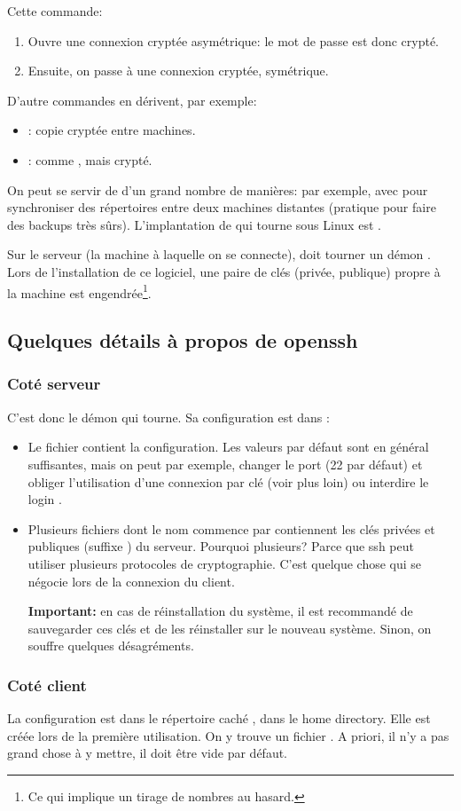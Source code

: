 \begin{center}
\end{center}

Cette commande:
\begin{enumerate}
\item Ouvre une connexion cryptée asymétrique: le mot de passe est
  donc crypté.
\item Ensuite, on passe à une connexion cryptée, symétrique.
\end{enumerate}

D'autre commandes en dérivent, par exemple:

\begin{itemize}
\item {}: copie cryptée entre machines.
\item {}: comme , mais crypté.
\end{itemize}

On peut se servir de  d'un grand nombre de manières: par
exemple, avec  pour synchroniser des répertoires entre deux
machines distantes (pratique pour faire des backups très
sûrs). L'implantation de  qui tourne sous Linux est .

Sur le serveur (la machine à laquelle on se connecte), doit tourner un
démon . Lors de l'installation de ce logiciel, une paire de
clés (privée, publique) propre à la machine  est engendrée\footnote{Ce
  qui implique un tirage 
  de nombres au hasard.}.


\subsection{Quelques détails à propos de openssh}
\subsubsection{Coté serveur} C'est donc le démon  qui
tourne.
Sa configuration est dans :
\begin{itemize}
  \item Le fichier  contient la configuration. Les
    valeurs par défaut sont en général suffisantes, mais on peut par
    exemple, changer le port (22 par défaut) et obliger l'utilisation
    d'une connexion par clé (voir plus loin) ou interdire le login
    .
  \item Plusieurs fichiers  dont le nom commence par 
    contiennent les clés privées et publiques (suffixe ) du
    serveur.
    Pourquoi plusieurs? Parce que ssh peut utiliser plusieurs
    protocoles de cryptographie. C'est quelque chose qui se négocie
    lors de la connexion du client.

    \textbf{Important:} en cas de réinstallation du système, il est
    recommandé de sauvegarder ces clés et de les réinstaller sur le
    nouveau système. Sinon, on souffre quelques désagréments.
\end{itemize}
\subsubsection{Coté client} La configuration est dans le répertoire
caché , dans le home directory. Elle est créée lors de la
première utilisation. On y trouve un fichier .
  A priori, il n'y a pas grand chose à y mettre, il
  doit être vide par défaut.

 
